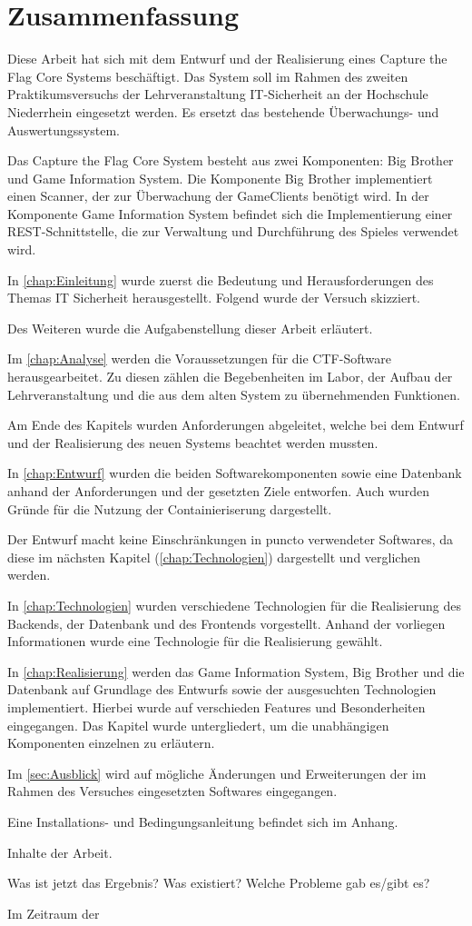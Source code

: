 \section{Zusammenfassung}
Diese Arbeit hat sich mit dem Entwurf und der Realisierung eines Capture the Flag Core Systems beschäftigt. Das System soll im Rahmen des zweiten Praktikumsversuchs der Lehrveranstaltung IT-Sicherheit an der Hochschule Niederrhein eingesetzt werden. Es ersetzt das bestehende Überwachungs- und Auswertungssystem.

Das Capture the Flag Core System besteht aus zwei Komponenten: Big Brother und Game Information System. Die Komponente Big Brother implementiert einen Scanner, der zur Überwachung der GameClients benötigt wird. In der Komponente Game Information System befindet sich die Implementierung einer REST-Schnittstelle, die zur Verwaltung und Durchführung des Spieles verwendet wird.

In \autoref{chap:Einleitung} wurde zuerst die Bedeutung und Herausforderungen des Themas IT Sicherheit herausgestellt. Folgend wurde der Versuch  skizziert.

Des Weiteren wurde die Aufgabenstellung dieser Arbeit erläutert.

Im \autoref{chap:Analyse} werden die Voraussetzungen für die CTF-Software herausgearbeitet. Zu diesen zählen die Begebenheiten im Labor, der Aufbau der Lehrveranstaltung und die aus dem alten System zu übernehmenden Funktionen.

Am Ende des Kapitels wurden Anforderungen abgeleitet, welche bei dem Entwurf und der Realisierung des neuen Systems beachtet werden mussten.

In \autoref{chap:Entwurf} wurden die beiden Softwarekomponenten sowie eine Datenbank anhand der Anforderungen und der gesetzten Ziele entworfen. Auch wurden Gründe für die Nutzung der Containieriserung dargestellt. 

Der Entwurf macht keine Einschränkungen in puncto verwendeter Softwares, da diese im nächsten Kapitel (\ref{chap:Technologien}) dargestellt und verglichen werden.

In \autoref{chap:Technologien} wurden verschiedene Technologien für die Realisierung des Backends, der Datenbank und des Frontends vorgestellt. Anhand der vorliegen Informationen wurde eine Technologie für die Realisierung gewählt.

In \autoref{chap:Realisierung} werden das Game Information System, Big Brother und die Datenbank auf Grundlage des Entwurfs sowie der ausgesuchten Technologien implementiert. Hierbei wurde auf verschieden Features und Besonderheiten eingegangen. Das Kapitel wurde untergliedert, um die unabhängigen Komponenten einzelnen zu erläutern.

Im \autoref{sec:Ausblick} wird auf mögliche Änderungen und Erweiterungen der im Rahmen des Versuches eingesetzten Softwares eingegangen.

Eine Installations- und Bedingungsanleitung befindet sich im Anhang.

Inhalte der Arbeit.

Was ist jetzt das Ergebnis? Was existiert? Welche Probleme gab es/gibt es?
 
Im Zeitraum der 